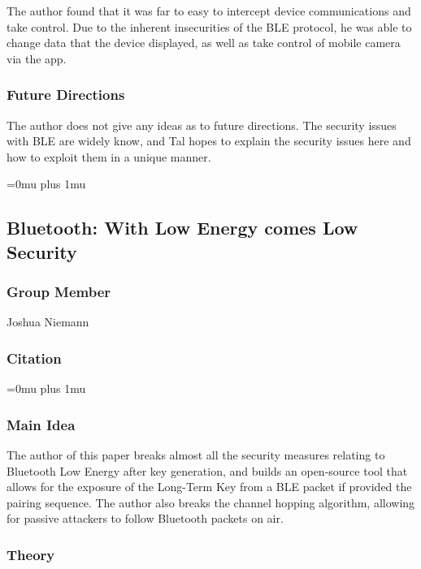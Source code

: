 \noindent
The author found that it was far to easy to intercept device communications and take control. Due to the inherent insecurities of the BLE protocol, he was able to change data that the device displayed, as well as take control of mobile camera via the app. 

\subsubsection{Future Directions}

\noindent
The author does not give any ideas as to future directions. The security issues with BLE are widely know, and Tal hopes to explain the security issues here and how to exploit them in a unique manner. 

\Urlmuskip=0mu plus 1mu\relax

\noindent
\subsection{{B}luetooth: {W}ith {L}ow {E}nergy comes {L}ow {S}ecurity}

\subsubsection{Group Member}

\noindent
Joshua Niemann

\noindent
\subsubsection{Citation}

\Urlmuskip=0mu plus 1mu\relax

\subsubsection{Main Idea}

\noindent
The author of this paper breaks almost all the security measures relating to Bluetooth Low Energy after key generation, and builds an open-source tool that allows for the exposure of the Long-Term Key from a BLE packet if provided the pairing sequence.  The author also breaks the channel hopping algorithm, allowing for passive attackers to follow Bluetooth packets on air.

\subsubsection{Theory}

